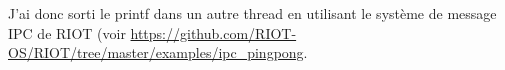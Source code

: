 \begin{comment}
C'est mieux ! Voyons si on peut compenser ces 25$\mu$ :
{\scriptsize
\begin{verbatim}
2020-05-07 17:46:00,323 # Loop duration 1999999 microseconds
2020-05-07 17:46:02,327 # Loop duration 2000000 microseconds
2020-05-07 17:46:04,329 # Loop duration 2000000 microseconds
2020-05-07 17:46:06,332 # Loop duration 2000000 microseconds
2020-05-07 17:46:08,335 # Loop duration 2000000 microseconds
2020-05-07 17:46:10,338 # Loop duration 2000000 microseconds
2020-05-07 17:46:12,341 # Loop duration 2000000 microseconds
2020-05-07 17:46:14,344 # Loop duration 2000000 microseconds
2020-05-07 17:46:16,347 # Loop duration 2000000 microseconds
2020-05-07 17:46:18,350 # Loop duration 2000000 microseconds
2020-05-07 17:46:20,353 # Loop duration 2000001 microseconds
2020-05-07 17:46:22,356 # Loop duration 2000000 microseconds
2020-05-07 17:46:24,358 # Loop duration 2000000 microseconds
2020-05-07 17:46:26,361 # Loop duration 2000000 microseconds
\end{verbatim}
}

On arrive quand même à quelque chose de relativement précis et stable.
Là j'étais sur la bleupill, évidament ce n'est pas portable, sur la
nucleo ça donne :
{\scriptsize
\begin{verbatim}
2020-05-07 17:59:44,341 # Loop duration 1999993 microseconds
2020-05-07 17:59:46,344 # Loop duration 1999994 microseconds
2020-05-07 17:59:48,347 # Loop duration 1999993 microseconds
2020-05-07 17:59:50,350 # Loop duration 1999993 microseconds
2020-05-07 17:59:52,353 # Loop duration 1999993 microseconds
2020-05-07 17:59:54,355 # Loop duration 1999993 microseconds
2020-05-07 17:59:56,359 # Loop duration 1999993 microseconds
2020-05-07 17:59:58,362 # Loop duration 1999993 microseconds
\end{verbatim}
}
\end{comment}

J'ai donc sorti le printf dans un autre thread en utilisant le système
de message IPC de RIOT (voir
\url{https://github.com/RIOT-OS/RIOT/tree/master/examples/ipc_pingpong}.
\\

